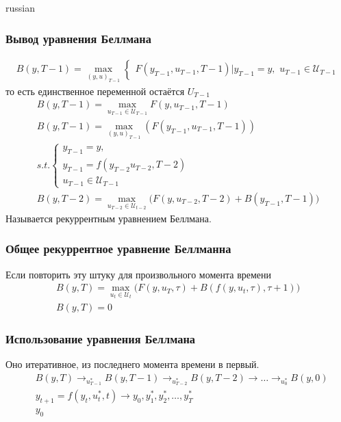 \documentclass{article}
\begin{document}
\begin{otherlanguage*}{russian}
\subsubsection*{Вывод уравнения Беллмана}
\begin{align*}
B(y, T - 1) = \max_{(y, u)_{T-1}} \begin{cases} F(y_{T-1}, u_{T-1}, T-1 )  | y_{T-1} = y, \,\, u_{T-1} \in \mathcal{U}_{T-1} \end{cases} 
\end{align*}
то есть единственное переменной остаётся  $ U_{T-1} $ 
\begin{align*}
B(y, T - 1) = \max_{ u_{T-1} \in \mathcal{U}_{T-1}} F(y, u_{T-1}, T-1) \\
B(y, T - 1) = \max_{(y, u)_{T-1}} (F(y_{T-1}, u_{T-1}, T-1 ))\\ s.t. \begin{cases}  y_{T-1} = y, \\
y_{T-1} = f(y_{T-2} u_{T-2} , T-2 ) \\
u_{T-1} \in \mathcal{U}_{T-1} 
\end{cases} \\
B(y, T - 2) = \max_{u_{T-2} \in \mathcal{U}_{t-2}} \Big( F(y, u_{T-2}, T-2) + B(y_{T-1}, T - 1) \Big)
\end{align*}
Называется рекуррентным уравнением Беллмана. 
\subsubsection*{Общее рекуррентное уравнение Беллманна}
Если повторить эту штуку для произвольного момента времени
\begin{align*}
B(y, T) = \max_{u_t \in \mathcal{U}_t} \Big( F(y, u_T, \tau) + B(f(y, u_t, \tau), \tau + 1)  \Big) \\
B(y, T) = 0 
\end{align*}
\subsubsection*{Использование уравнения Беллмана}
Оно итеративное, из последнего момента времени в первый. 
\begin{align*}
& B(y, T) \rightarrow_{u^*_{T-1}} B(y, T-1) \rightarrow_{u^*_{T-2}} B(y, T - 2) \rightarrow  \ldots \rightarrow_{u^*_0} B(y, 0) \\
& y_{t+1} = f(y_t, u_t^*, t) \rightarrow y_0, y_1 ^* , y_2^*, \ldots, y^*_T\\
& y_0 
\end{align*}

\end{otherlanguage*}
\end{document}
